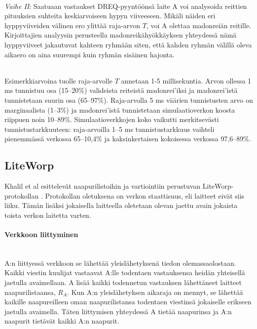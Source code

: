 \documentclass[finnish]{tktltiki2}
\theoremstyle{definition}
\theoremstyle{remark}
\begin{document}
\noindent \\
\emph{Vaihe II}: Saatuaan vastaukset DREQ-pyyntöönsä laite A voi analysoida reittien pituuksien suhteita keskiarvoiseen hypyn viiveeseen. Mikäli näiden eri hyppyviiveiden välinen ero ylittää raja-arvon $T$, voi A olettaa madonreiän reitille. Kirjoittajien analyysin perusteella madonreikähyökkäyksen yhteydessä nämä hyppyviiveet jakautuvat kahteen ryhmään siten, että kahden ryhmän välillä oleva aikaero on aina suurempi kuin ryhmän sisäinen hajonta. 

\noindent \\
Esimerkkiarvoina tuolle raja-arvolle $T$ annetaan 1-5 millisekuntia. Arvon ollessa 1 ms tunnistuu osa (15--20\%) valideista reiteistä madonrei'iksi ja madonrei'istä tunnistetaan suurin osa (65--97\%). Raja-arvolla 5 ms väärien tunnistusten arvo on marginaalista (1--3\%) ja madonrei'istä tunnistetaan simulaatioverkon koosta riippuen noin 10--89\%. Simulaatioverkkojen koko vaikutti merkitsevästi tunnistustarkkuuteen: raja-arvoilla 1--5 ms tunnistustarkkuus vaihteli pienemmässä verkossa 65--10,4\% ja kaksinkertaisen kokoisessa verkossa 97,6--89\%.

% 
% 
% 
% 
% 
% 
% 
% 
% 
% 

\subsection{LiteWorp}
% 
% 
% 
% 
% 
% 
% 
% 
% 
% 
% 
% 

Khalil et al esittelevät naapurilistoihin ja vartiointiin perustuvan LiteWorp-protokollan \cite{liteworp}. Protokollan oletuksena on verkon staattisuus, eli laitteet eivät siis liiku. Tämän lisäksi jokaisella laitteella oletetaan olevan jaettu avain jokaista toista verkon laitetta varten.

\paragraph{Verkkoon liittyminen}
\noindent \\
A:n liittyessä verkkoon se lähettää yleislähetyksenä tiedon olemassaolostaan. Kaikki viestin kuulijat vastaavat A:lle todentaen vastauksensa heidän yhteisellä jaetulla avaimellaan. A lisää kaikki todennetun vastauksen lähettäneet laitteet naapurilistaansa, $R_A$. Kun A:n yleislähetyksen aikaraja on mennyt, se lähettää kaikille naapureilleen oman naapurilistansa todentaen viestinsä jokaiselle erikseen jaetulla avaimella. Täten liittymisen yhteydessä A tietää naapurinsa ja A:n naapurit tietävät kaikki A:n naapurit.
\end{document}
